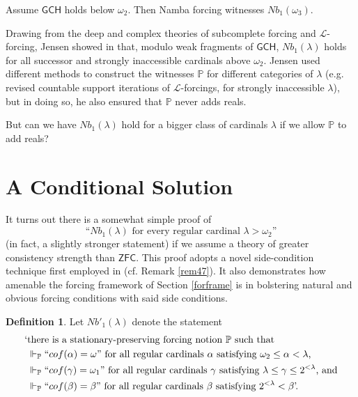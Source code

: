 \documentclass[12pt, twoside]{memoir}
\numberwithin{equation}{section}
\theoremstyle{definition}
\newtheorem{defi}[thm]{Definition}
\theoremstyle{remark}
\theoremstyle{definition}
\theoremstyle{definition}
\theoremstyle{definition}
\theoremstyle{remark}
\newenvironment{customfact}[1]
  {\renewcommand\theinnercustomfact{#1}\innercustomfact}
  {\endinnercustomfact}
\begin{document}
\begin{customfact}{4.7$'$}\label{f46p}
Assume $\mathsf{GCH}$ holds below $\omega_2$. Then Namba forcing witnesses $Nb_1(\omega_3)$.
\end{customfact}

Drawing from the deep and complex theories of subcomplete forcing and $\mathcal{L}$-forcing, Jensen showed in \cite{lforcing} that, modulo weak fragments of $\mathsf{GCH}$, $Nb_1(\lambda)$ holds for all successor and strongly inaccessible cardinals above $\omega_2$. Jensen used different methods to construct the witnesses $\mathbb{P}$ for different categories of $\lambda$ (e.g. revised countable support iterations of $\mathcal{L}$-forcings, for strongly inaccessible $\lambda$), but in doing so, he also ensured that $\mathbb{P}$ never adds reals. 

But can we have $Nb_1(\lambda)$ hold for a bigger class of cardinals $\lambda$ if we allow $\mathbb{P}$ to add reals?

\section{A Conditional Solution}

It turns out there is a somewhat simple proof of $$\text{``} Nb_1(\lambda) \text{ for every regular cardinal } \lambda > \omega_2 \text{''}$$ (in fact, a slightly stronger statement) if we assume a theory of greater consistency strength than $\mathsf{ZFC}$. This proof adopts a novel side-condition technique first employed in \cite{schindler} (cf. Remark \ref{rem47}). It also demonstrates how amenable the forcing framework of Section \ref{forframe} is in bolstering natural and obvious forcing conditions with said side conditions. 

\begin{defi}
Let $Nb'_1(\lambda)$ denote the statement
\begin{align*}
    \text{`} & \text{there is a stationary-preserving forcing notion } \mathbb{P} \text{ such that} \\ 
    & \Vdash_{\mathbb{P}} ``cof(\alpha) = \omega" \text{ for all regular cardinals } \alpha \text{ satisfying } \omega_2 \leq \alpha < \lambda \text{,} \\
    & \Vdash_{\mathbb{P}} ``cof(\gamma) = \omega_1" \text{ for all regular cardinals } \gamma \text{ satisfying } \lambda \leq \gamma \leq 2^{< \lambda} \text{, and} \\
    & \Vdash_{\mathbb{P}} ``cof(\beta) = \beta" \text{ for all regular cardinals } \beta \text{ satisfying } 2^{< \lambda} < \beta \text{'.}
\end{align*}
\end{defi}
\end{document}
